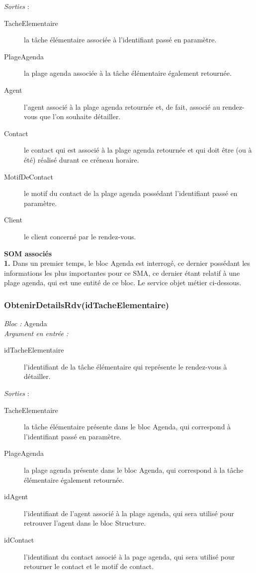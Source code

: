 \noindent \textit{Sorties} : 
\begin{description}
\item[TacheElementaire] la tâche élémentaire associée à l'identifiant passé en paramètre.
\item[PlageAgenda] la plage agenda associée à la tâche élémentaire également retournée.
\item[Agent] l'agent associé à la plage agenda retournée et, de fait, associé au rendez-vous que l'on souhaite détailler. 
\item[Contact] le contact qui est associé à la plage agenda retournée et qui doit être (ou à été) réalisé durant ce créneau horaire.
\item[MotifDeContact] le motif du contact de la plage agenda possédant l'identifiant passé en paramètre. 
\item[Client] le client concerné par le rendez-vous. \\
\end{description}


\begin{shaded}
\textbf{SOM associés}\\
\textbf{1.} Dans un premier temps, le bloc Agenda est interrogé, ce dernier possédant les informations les plus importantes pour ce SMA, ce dernier étant relatif à une plage agenda, qui est une entité de ce bloc. Le service objet métier ci-dessous.
\end{shaded}


\subsubsection{ObtenirDetailsRdv(idTacheElementaire)}
\noindent \textit{Bloc : } Agenda \\

\noindent \textit{Argument en entrée :}
\begin{description}
\item[idTacheElementaire] l'identifiant de la tâche élémentaire qui représente le rendez-vous à détailler. \\
\end{description}

\noindent \textit{Sorties} : 
\begin{description}
\item[TacheElementaire] la tâche élémentaire présente dans le bloc Agenda, qui correspond à l'identifiant passé en paramètre.
\item[PlageAgenda] la plage agenda présente dans le bloc Agenda, qui correspond à la tâche élémentaire également retournée.
\item[idAgent] l'identifiant de l'agent associé à la plage agenda, qui sera utilisé pour retrouver l'agent dans le bloc Structure. 
\item[idContact] l'identifiant du contact associé à la page agenda, qui sera utilisé pour retourner le contact et le motif de contact. \\
\end{description}

